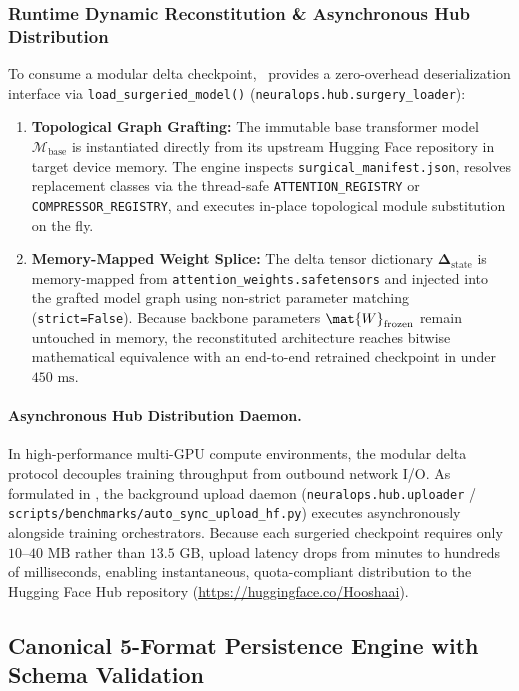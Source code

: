 \subsubsection{Runtime Dynamic Reconstitution \& Asynchronous Hub Distribution}
To consume a modular delta checkpoint, \neuralops\ provides a zero-overhead deserialization interface via \linebreak \texttt{load\_surgeried\_model()} (\texttt{neuralops.hub.surgery\_loader}):
\begin{enumerate}
    \item \textbf{Topological Graph Grafting:} The immutable base transformer model $\mathcal{M}_{\text{base}}$ is instantiated directly from its upstream Hugging Face repository in target device memory. The engine inspects \texttt{surgical\_manifest.json}, resolves replacement classes via the thread-safe \texttt{ATTENTION\_REGISTRY} or \texttt{COMPRESSOR\_REGISTRY}, and executes in-place topological module substitution on the fly.
    \item \textbf{Memory-Mapped Weight Splice:} The delta tensor dictionary $\mathbf{\Delta}_{\text{state}}$ is memory-mapped from \texttt{attention\_weights.safetensors} and injected into the grafted model graph using non-strict parameter matching (\texttt{strict=False}). Because backbone parameters $\mat{W}_{\text{frozen}}$ remain untouched in memory, the reconstituted architecture reaches bitwise mathematical equivalence with an end-to-end retrained checkpoint in under \textbf{$450\text{ ms}$}.
\end{enumerate}

\paragraph{Asynchronous Hub Distribution Daemon.}
In high-performance multi-GPU compute environments, the modular delta protocol decouples training throughput from outbound network I/O. As formulated in , the background upload daemon (\texttt{neuralops.hub.uploader} / \texttt{scripts/benchmarks/auto\_sync\_upload\_hf.py}) executes asynchronously alongside training orchestrators. Because each surgeried checkpoint requires only \textbf{$10\text{--}40\text{ MB}$} rather than $13.5\text{ GB}$, upload latency drops from minutes to hundreds of milliseconds, enabling instantaneous, quota-compliant distribution to the Hugging Face Hub repository (\url{https://huggingface.co/Hooshaai}).

\subsection{Canonical 5-Format Persistence Engine with Schema Validation}
\label{subsec:5format_persistence_engine}

